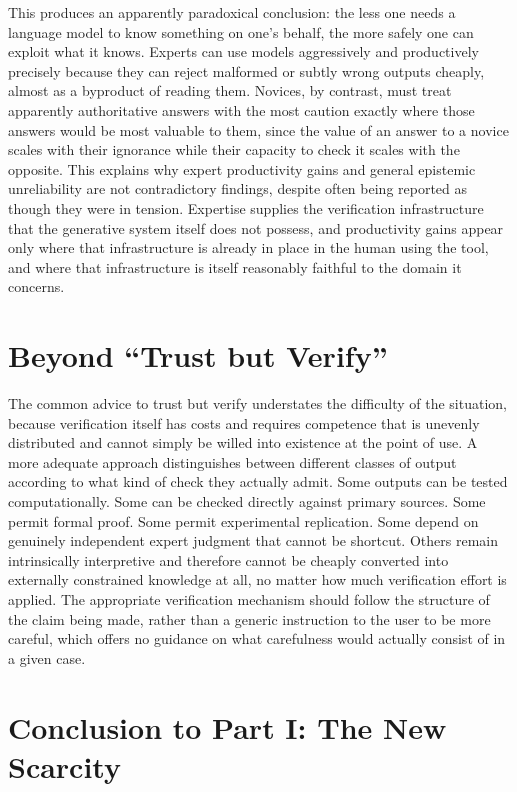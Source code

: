 \documentclass[11pt]{article}
\begin{document}
This produces an apparently paradoxical conclusion: the less one needs a language model to know something on one's behalf, the more safely one can exploit what it knows. Experts can use models aggressively and productively precisely because they can reject malformed or subtly wrong outputs cheaply, almost as a byproduct of reading them. Novices, by contrast, must treat apparently authoritative answers with the most caution exactly where those answers would be most valuable to them, since the value of an answer to a novice scales with their ignorance while their capacity to check it scales with the opposite. This explains why expert productivity gains and general epistemic unreliability are not contradictory findings, despite often being reported as though they were in tension. Expertise supplies the verification infrastructure that the generative system itself does not possess, and productivity gains appear only where that infrastructure is already in place in the human using the tool, and where that infrastructure is itself reasonably faithful to the domain it concerns.

\section{Beyond ``Trust but Verify''}

The common advice to trust but verify understates the difficulty of the situation, because verification itself has costs and requires competence that is unevenly distributed and cannot simply be willed into existence at the point of use. A more adequate approach distinguishes between different classes of output according to what kind of check they actually admit. Some outputs can be tested computationally. Some can be checked directly against primary sources. Some permit formal proof. Some permit experimental replication. Some depend on genuinely independent expert judgment that cannot be shortcut. Others remain intrinsically interpretive and therefore cannot be cheaply converted into externally constrained knowledge at all, no matter how much verification effort is applied. The appropriate verification mechanism should follow the structure of the claim being made, rather than a generic instruction to the user to be more careful, which offers no guidance on what carefulness would actually consist of in a given case.

\section{Conclusion to Part I: The New Scarcity}
\end{document}
